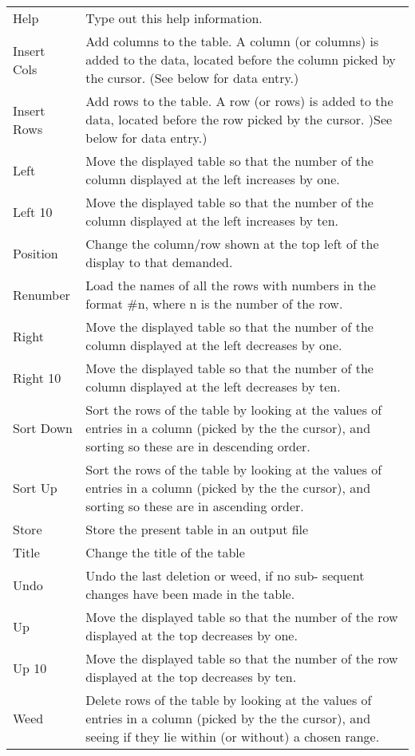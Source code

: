 {{\begin{tabular}{|l|p{4.5in}|}
 Help        &  Type out this help information. \\
 Insert Cols &  Add columns to the table. A column (or columns)
                is added to the data, located before the
                column picked by the cursor. (See below for
                data entry.) \\
 Insert Rows &  Add rows to the table. A row (or rows)
                is added to the data, located before the
                row picked by the cursor. )See below for
                data entry.) \\ 
 Left        &  Move the displayed table so that the number
                of the column displayed at the left increases
                by one. \\
 Left 10     &  Move the displayed table so that the number
                of the column displayed at the left increases
                by ten. \\
 Position    &  Change the column/row shown at the top left
                of the display to that demanded. \\
 Renumber    &  Load the names of all the rows with numbers
                in the format \#n, where n is the number of
                the row. \\
 Right       &  Move the displayed table so that the number
                of the column displayed at the left decreases
                by one. \\
 Right 10    &   Move the displayed table so that the number
                of the column displayed at the left decreases
                by ten. \\
 Sort Down   &  Sort the rows of the table by looking at the
                values of entries in a column (picked by the
                the cursor), and sorting so these are in
                descending order. \\
 Sort Up     &  Sort the rows of the table by looking at the
                values of entries in a column (picked by the
                the cursor), and sorting so these are in
                ascending order. \\
 Store       &  Store the present table in an output file \\
 Title      &   Change the title of the table \\
 Undo       &   Undo the last deletion or weed, if no sub-
                sequent changes have been made in the table. \\
 Up         &   Move the displayed table so that the number
                of the row displayed at the top decreases
                by one. \\
 Up 10      &   Move the displayed table so that the number
                of the row displayed at the top decreases
                by ten. \\
 Weed       &   Delete rows of the table by looking at the
                values of entries in a column (picked by the
                the cursor), and seeing if they lie within
                (or without) a chosen range. \\ \hline
\end{tabular}
                                                                               
}}
